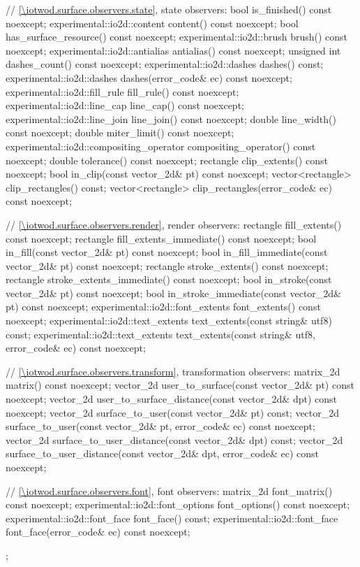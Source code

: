 \begin{codeblock}
{{{{{    // \ref{\iotwod.surface.observers.state}, state observers:
    bool is_finished() const noexcept;
    experimental::io2d::content content() const noexcept;
    bool has_surface_resource() const noexcept;
    experimental::io2d::brush brush() const noexcept;
    experimental::io2d::antialias antialias() const noexcept;
    unsigned int dashes_count() const noexcept;
    experimental::io2d::dashes dashes() const;
    experimental::io2d::dashes dashes(error_code& ec) const noexcept;
    experimental::io2d::fill_rule fill_rule() const noexcept;
    experimental::io2d::line_cap line_cap() const noexcept;
    experimental::io2d::line_join line_join() const noexcept;
    double line_width() const noexcept;
    double miter_limit() const noexcept;
    experimental::io2d::compositing_operator compositing_operator() const
      noexcept;
    double tolerance() const noexcept;
    rectangle clip_extents() const noexcept;
    bool in_clip(const vector_2d& pt) const noexcept;
    vector<rectangle> clip_rectangles() const;
    vector<rectangle> clip_rectangles(error_code& ec) const noexcept;
    
    // \ref{\iotwod.surface.observers.render}, render observers:
    rectangle fill_extents() const noexcept;
    rectangle fill_extents_immediate() const noexcept;
    bool in_fill(const vector_2d& pt) const noexcept;
    bool in_fill_immediate(const vector_2d& pt) const noexcept;
    rectangle stroke_extents() const noexcept;
    rectangle stroke_extents_immediate() const noexcept;
    bool in_stroke(const vector_2d& pt) const noexcept;
    bool in_stroke_immediate(const vector_2d& pt) const noexcept;
    experimental::io2d::font_extents font_extents() const noexcept;
    experimental::io2d::text_extents text_extents(const string& utf8) const;
    experimental::io2d::text_extents text_extents(const string& utf8,
      error_code& ec) const noexcept;
    
    // \ref{\iotwod.surface.observers.transform}, transformation observers:
    matrix_2d matrix() const noexcept;
    vector_2d user_to_surface(const vector_2d& pt) const noexcept;
    vector_2d user_to_surface_distance(const vector_2d& dpt) const noexcept;
    vector_2d surface_to_user(const vector_2d& pt) const;
    vector_2d surface_to_user(const vector_2d& pt, error_code& ec) const
      noexcept;
    vector_2d surface_to_user_distance(const vector_2d& dpt) const;
    vector_2d surface_to_user_distance(const vector_2d& dpt, error_code& ec)
      const noexcept;
    
    // \ref{\iotwod.surface.observers.font}, font observers:
    matrix_2d font_matrix() const noexcept;
    experimental::io2d::font_options font_options() const noexcept;
    experimental::io2d::font_face font_face() const;
    experimental::io2d::font_face font_face(error_code& ec) const noexcept;
  };
} } } }
\end{codeblock}

